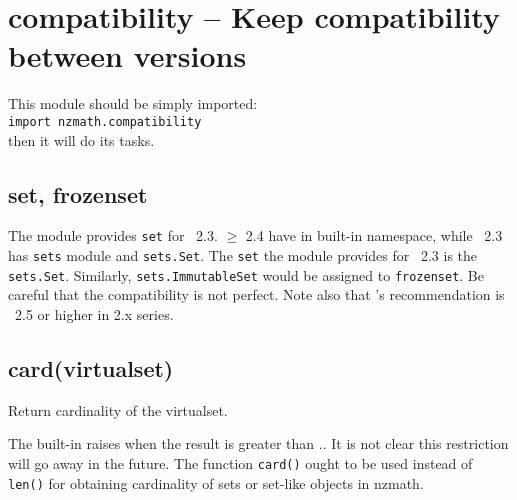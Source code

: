 

 \section{compatibility -- Keep compatibility between \python versions}
%
This module should be simply imported:\\
{\tt import nzmath.compatibility}\\
then it will do its tasks.

  \subsection{set, frozenset}

  The module provides {\tt set} for \python~2.3. \python \(\geq\) 2.4
  have  in
  built-in namespace, while \python~2.3 has {\tt sets} module and
  {\tt sets.Set}. The {\tt set} the module provides for \python~2.3
  is the {\tt sets.Set}. Similarly, {\tt sets.ImmutableSet} would be
  assigned to {\tt frozenset}. Be careful that the compatibility
  is not perfect.  Note also that \nzmath's recommendation is
  \python~2.5 or higher in 2.x series.

  \subsection{card(virtualset)}

  Return cardinality of the virtualset.

  The built-in  raises 
  when the result is greater than
  .. It is not
  clear this restriction will go away in the future.
  The function {\tt card()} ought to be used instead of {\tt len()} for
  obtaining cardinality of sets or set-like objects in nzmath.

\C


